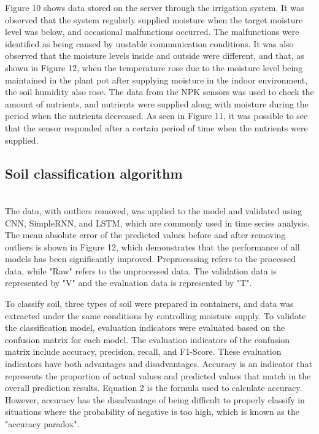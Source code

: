 \documentclass[11pt]{article}
\begin{document}
Figure 10 shows data stored on the server through the irrigation system. It was observed that the system regularly supplied moisture when the target moisture level was below, and occasional malfunctions occurred. The malfunctions were identified as being caused by unstable communication conditions. It was also observed that the moisture levels inside and outside were different, and that, as shown in Figure 12, when the temperature rose due to the moisture level being maintained in the plant pot after supplying moisture in the indoor environment, the soil humidity also rose. The data from the NPK sensors was used to check the amount of nutrients, and nutrients were supplied along with moisture during the period when the nutrients decreased. As seen in Figure 11, it was possible to see that the sensor responded after a certain period of time when the nutrients were supplied.

\subsection{Soil classification algorithm}
\indent \\The data, with outliers removed, was applied to the model and validated using CNN, SimpleRNN, and LSTM, which are commonly used in time series analysis. The mean absolute error of the predicted values before and after removing outliers is shown in Figure 12, which demonstrates that the performance of all models has been significantly improved. Preprocessing refers to the processed data, while "Raw" refers to the unprocessed data. The validation data is represented by "V" and the evaluation data is represented by "T".

To classify soil, three types of soil were prepared in containers, and data was extracted under the same conditions by controlling moisture supply. To validate the classification model, evaluation indicators were evaluated based on the confusion matrix for each model. The evaluation indicators of the confusion matrix include accuracy, precision, recall, and F1-Score. These evaluation indicators have both advantages and disadvantages. Accuracy is an indicator that represents the proportion of actual values and predicted values that match in the overall prediction results. Equation 2 is the formula used to calculate accuracy. However, accuracy has the disadvantage of being difficult to properly classify in situations where the probability of negative is too high, which is known as the "accuracy paradox".
\end{document}

